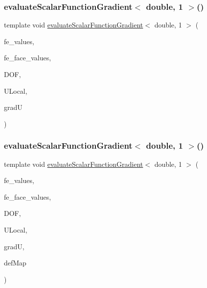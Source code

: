 \mbox{\label{function_evaluations_8cc_a91bad8776fff0a4128d167e13f9cba03}} 
\subsubsection{\texorpdfstring{evaluateScalarFunctionGradient$<$ double, 1 $>$()}{evaluateScalarFunctionGradient< double, 1 >()}\hspace{0.1cm}{\footnotesize\ttfamily [3/4]}}
{\footnotesize\ttfamily template void \mbox{\hyperlink{group___evaluation_functions_gabedd4ae2841d2332ed0df0513b189e34}{evaluate\+Scalar\+Function\+Gradient}}$<$ double, 1 $>$ (\begin{DoxyParamCaption}\item[{const F\+E\+Values$<$ 1 $>$ \&}]{fe\+\_\+values,  }\item[{const F\+E\+Face\+Values$<$ 1 $>$ \&}]{fe\+\_\+face\+\_\+values,  }\item[{unsigned int}]{D\+OF,  }\item[{Table$<$ 1, double $>$ \&}]{U\+Local,  }\item[{Table$<$ 2, double $>$ \&}]{gradU }\end{DoxyParamCaption})}

\mbox{\label{function_evaluations_8cc_a089c72529f691dcdbd062a644a861a93}} 
\subsubsection{\texorpdfstring{evaluateScalarFunctionGradient$<$ double, 1 $>$()}{evaluateScalarFunctionGradient< double, 1 >()}\hspace{0.1cm}{\footnotesize\ttfamily [4/4]}}
{\footnotesize\ttfamily template void \mbox{\hyperlink{group___evaluation_functions_gabedd4ae2841d2332ed0df0513b189e34}{evaluate\+Scalar\+Function\+Gradient}}$<$ double, 1 $>$ (\begin{DoxyParamCaption}\item[{const F\+E\+Values$<$ 1 $>$ \&}]{fe\+\_\+values,  }\item[{const F\+E\+Face\+Values$<$ 1 $>$ \&}]{fe\+\_\+face\+\_\+values,  }\item[{unsigned int}]{D\+OF,  }\item[{Table$<$ 1, double $>$ \&}]{U\+Local,  }\item[{Table$<$ 2, double $>$ \&}]{gradU,  }\item[{\mbox{\hyperlink{structdeformation_map}{deformation\+Map}}$<$ double, 1 $>$ \&}]{def\+Map }\end{DoxyParamCaption})}

